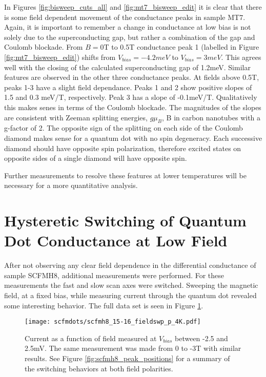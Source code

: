 In Figures \ref{fig:bisweep_cuts_all} and \ref{fig:mt7_bisweep_edit} it is clear that there is some field dependent movement of the conductance peaks in sample MT7. Again, it is important to remember a change in conductance at low bias is not solely due to the superconducting gap, but rather a combination of the gap and Coulomb blockade. From $B=0$T to 0.5T conductance peak 1 (labelled in Figure \ref{fig:mt7_bisweep_edit}) shifts from $V_{bias}=-4.2meV$ to $V_{bias}=3meV$. This agrees well with the closing of the calculated superconducting gap of 1.2meV. Similar features are observed in the other three conductance peaks. At fields above 0.5T, peaks 1-3 have a slight field dependance. Peaks 1 and 2 show positive slopes of 1.5 and 0.3 meV/T, respectively. Peak 3 has a slope of -0.1meV/T. Qualitatively this makes senes in terms of the Coulomb blockade. The magnitudes of the slopes are consistent with Zeeman splitting energies, $g \mu_B$, B in carbon nanotubes with a g-factor of 2. The opposite sign of the splitting on each side of the Coulomb diamond makes sense for a quantum dot with no spin degeneracy. Each successive diamond should have opposite spin polarization, therefore excited states on opposite sides of a single diamond will have opposite spin. 

Further measurements to resolve these features at lower temperatures will be necessary for a more quantitative analysis.

\section{Hysteretic Switching of Quantum Dot Conductance at Low Field}
\label{sec:scfm_switching}

After not observing any clear field dependence in the differential conductance of sample SCFMH8, additional measurements were performed. For these measurements the fast and slow scan axes were switched. Sweeping the magnetic field, at a fixed bias, while measuring current through the quantum dot revealed some interesting behavior. The full data set is seen in Figure \ref{fig:scfmh8_positive_field_switching}.

\begin{figure}
    \centering
    \texttt{[image: scfmdots/scfmh8\_15-16\_fieldswp\_p\_4K.pdf]}
    \caption{Current as a function of field measured at $V_{bias}$ between -2.5 and 2.5mV. The same measurement was made from 0 to -3T with similar results. See Figure \ref{fig:scfmh8_peak_positions} for a summary of the switching behaviors at both field polarities.}
    \label{fig:scfmh8_positive_field_switching}
\end{figure}

